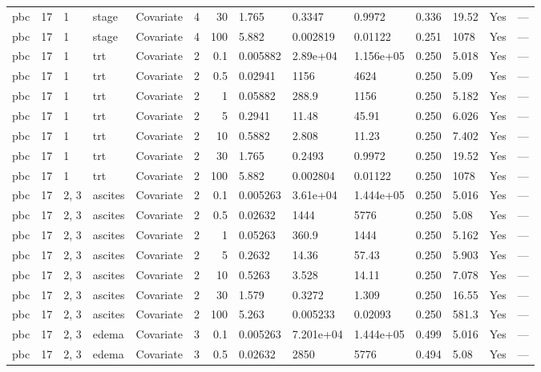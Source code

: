 \begin{tabular}{lrlllrrlllllll}
  pbc & 17 & 1 & stage & Covariate & 4 &    30 & 1.765 & 0.3347 & 0.9972 & 0.336 & 19.52 & Yes & --- \\ 
  pbc & 17 & 1 & stage & Covariate & 4 &   100 & 5.882 & 0.002819 & 0.01122 & 0.251 & 1078 & Yes & --- \\ 
  pbc & 17 & 1 & trt & Covariate & 2 &   0.1 & 0.005882 & 2.89e+04 & 1.156e+05 & 0.250 & 5.018 & Yes & --- \\ 
  pbc & 17 & 1 & trt & Covariate & 2 &   0.5 & 0.02941 & 1156 & 4624 & 0.250 & 5.09 & Yes & --- \\ 
  pbc & 17 & 1 & trt & Covariate & 2 &     1 & 0.05882 & 288.9 & 1156 & 0.250 & 5.182 & Yes & --- \\ 
  pbc & 17 & 1 & trt & Covariate & 2 &     5 & 0.2941 & 11.48 & 45.91 & 0.250 & 6.026 & Yes & --- \\ 
  pbc & 17 & 1 & trt & Covariate & 2 &    10 & 0.5882 & 2.808 & 11.23 & 0.250 & 7.402 & Yes & --- \\ 
  pbc & 17 & 1 & trt & Covariate & 2 &    30 & 1.765 & 0.2493 & 0.9972 & 0.250 & 19.52 & Yes & --- \\ 
  pbc & 17 & 1 & trt & Covariate & 2 &   100 & 5.882 & 0.002804 & 0.01122 & 0.250 & 1078 & Yes & --- \\ 
  pbc & 17 & 2, 3 & ascites & Covariate & 2 &   0.1 & 0.005263 & 3.61e+04 & 1.444e+05 & 0.250 & 5.016 & Yes & --- \\ 
  pbc & 17 & 2, 3 & ascites & Covariate & 2 &   0.5 & 0.02632 & 1444 & 5776 & 0.250 & 5.08 & Yes & --- \\ 
  pbc & 17 & 2, 3 & ascites & Covariate & 2 &     1 & 0.05263 & 360.9 & 1444 & 0.250 & 5.162 & Yes & --- \\ 
  pbc & 17 & 2, 3 & ascites & Covariate & 2 &     5 & 0.2632 & 14.36 & 57.43 & 0.250 & 5.903 & Yes & --- \\ 
  pbc & 17 & 2, 3 & ascites & Covariate & 2 &    10 & 0.5263 & 3.528 & 14.11 & 0.250 & 7.078 & Yes & --- \\ 
  pbc & 17 & 2, 3 & ascites & Covariate & 2 &    30 & 1.579 & 0.3272 & 1.309 & 0.250 & 16.55 & Yes & --- \\ 
  pbc & 17 & 2, 3 & ascites & Covariate & 2 &   100 & 5.263 & 0.005233 & 0.02093 & 0.250 & 581.3 & Yes & --- \\ 
  pbc & 17 & 2, 3 & edema & Covariate & 3 &   0.1 & 0.005263 & 7.201e+04 & 1.444e+05 & 0.499 & 5.016 & Yes & --- \\ 
  pbc & 17 & 2, 3 & edema & Covariate & 3 &   0.5 & 0.02632 & 2850 & 5776 & 0.494 & 5.08 & Yes & --- \\ 

\end{tabular}
